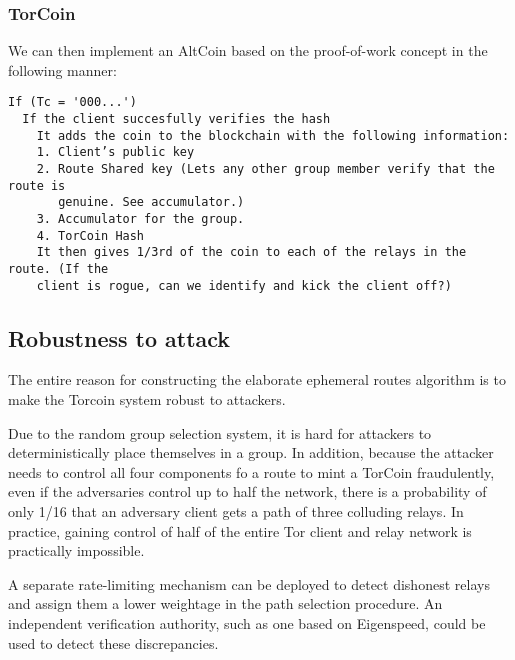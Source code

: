 \subsubsection{TorCoin}
We can then implement an AltCoin based on the proof-of-work concept in the following manner:
\begin{verbatim}
If (Tc = '000...')
  If the client succesfully verifies the hash
    It adds the coin to the blockchain with the following information:
    1. Client’s public key
    2. Route Shared key (Lets any other group member verify that the route is 
       genuine. See accumulator.)
    3. Accumulator for the group.
    4. TorCoin Hash
    It then gives 1/3rd of the coin to each of the relays in the route. (If the 
    client is rogue, can we identify and kick the client off?)
\end{verbatim}

\subsection{Robustness to attack}
The entire reason for constructing the elaborate ephemeral routes algorithm is to make the Torcoin system robust to attackers.

Due to the random group selection system, it is hard for attackers to deterministically place themselves in a group. In addition, because the attacker needs to control all four components fo a route to mint a TorCoin fraudulently, even if the adversaries control up to half the network, there is a probability of only 1/16 that an adversary client gets a path of three colluding relays. In practice, gaining control of half of the entire Tor client and relay network is practically impossible. 

A separate rate-limiting mechanism can be deployed to detect dishonest relays and assign them a lower weightage in the path selection procedure. An independent verification authority, such as one based on Eigenspeed, could be used to detect these discrepancies.